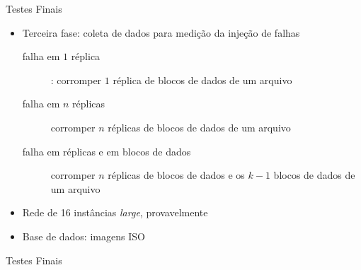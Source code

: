   \begin{frame}{Testes Finais}
     \begin{itemize}
        \item<1-> Terceira fase: coleta de dados para medição da injeção de falhas
           \begin{description}
              \item [falha em $1$ réplica]: corromper $1$ réplica de blocos de dados de um arquivo
              \item [falha em $n$ réplicas] corromper $n$ réplicas de blocos de dados de um arquivo
              \item [falha em réplicas e em blocos de dados] corromper $n$ réplicas de blocos de dados e os $k-1$ blocos de dados de um arquivo
            \end{description}
        \item<2-> Rede de 16 instâncias \emph{large}, provavelmente
        \item<3-> Base de dados: imagens ISO
     \end{itemize}
  \end{frame}

  \begin{frame}{Testes Finais}

     

  \end{frame}
